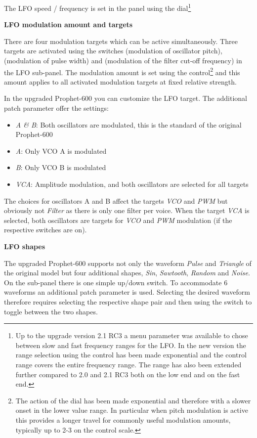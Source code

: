 The LFO speed / frequency is set in the panel using the \lfofreq dial\footnote{Up to the upgrade version 2.1 RC3 a menu parameter was available to chose between slow and fast frequency ranges for the LFO. In the new version the range selection using the \lfofreq control has been made exponential and the control range covers the entire frequency range. The range has also been extended further compared to 2.0 and 2.1 RC3 both on the low end and on the fast end.} 

\textbf{LFO modulation amount and targets}

There are four modulation targets which can be active simultaneously. Three targets are activated using the switches \lfovco (modulation of oscillator pitch), \lfopwm (modulation of pulse width) and \lfofil (modulation of the filter cut-off frequency) in the LFO sub-panel. The modulation amount is set using the \lfoamt control\footnote{The action of the \lfoamt dial has been made exponential and therefore with a slower onset in the lower value range. In particular when pitch modulation is active this provides a longer travel for commonly useful modulation amounts, typically up to 2-3 on the control scale.} and this amount applies to all activated modulation targets at fixed relative strength. 

In the upgraded Prophet-600 you can customize the LFO target. The additional patch parameter \lfotarget
offer the settings: 

\begin{itemize}
  \item \textit{A \& B}: Both oscillators are modulated, this is the standard of the original Prophet-600 
  \item \textit{A}: Only VCO A is modulated
  \item \textit{B}: Only VCO B is modulated
  \item \textit{VCA}: Amplitude modulation, and both oscillators are selected for all targets
\end{itemize}

The choices for oscillators A and B affect the targets \textit{VCO} and \textit{PWM} but obviously not \textit{Filter} as there is only one filter per voice. When the target \textit{VCA} is selected, both oscillators are targets for \textit{VCO} and \textit{PWM} modulation (if the respective switches are on). 

\textbf{LFO shapes}

The upgraded Prophet-600 supports not only the waveform \textit{Pulse} and \textit{Triangle} of the original model but four additional shapes, \textit{Sin}, \textit{Sawtooth}, \textit{Random} and \textit{Noise}. On the sub-panel there is one simple up/down \shapeswitch switch. To accommodate 6 waveforms an additional patch parameter \lfoshape is used. Selecting the desired waveform therefore requires selecting the respective shape pair and then using the \shapeswitch switch to toggle between the two shapes. 

